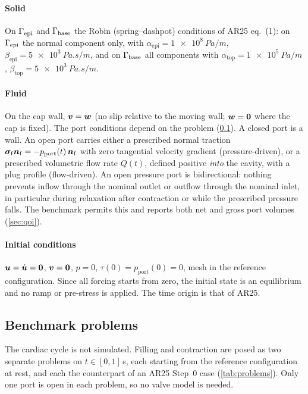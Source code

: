 \paragraph{Solid} On $\Gamma_{\mathrm{epi}}$ and $\Gamma_{\mathrm{base}}$ the Robin (spring--dashpot)
conditions of AR25 eq.~(1): on $\Gamma_{\mathrm{epi}}$ the normal component only, with
$\alpha_{\mathrm{epi}}=\SI{1e8}{Pa/m}$, $\beta_{\mathrm{epi}}=\SI{5e3}{Pa.s/m}$,
and on $\Gamma_{\mathrm{base}}$ all components with $\alpha_{\mathrm{top}}=\SI{1e5}{Pa/m}$,
$\beta_{\mathrm{top}}=\SI{5e3}{Pa.s/m}$.

\paragraph{Fluid} On the cap wall, $\bm{v}=\bm{w}$ (no slip relative to the moving
wall; $\bm{w}=\bm{0}$ where the cap is fixed). The port conditions depend on
the problem (\cref{sec:steps}). A closed port is a wall. An open port
carries either a prescribed normal traction
$\bm{\sigma}_{\mathrm f}\bm{n}_{\mathrm f} = -p_{\mathrm{port}}(t)\,\bm{n}_{\mathrm f}$
with zero tangential velocity gradient (pressure-driven), or a prescribed
volumetric flow rate $Q(t)$, defined positive \emph{into} the cavity, with a
plug profile (flow-driven). An open pressure port is bidirectional: nothing
prevents inflow through the nominal outlet or outflow through the nominal
inlet, in particular during relaxation after contraction or while the
prescribed pressure falls. The benchmark permits this and reports both net
and gross port volumes (\cref{sec:qoi}).

\paragraph{Initial conditions} $\bm{u}=\dot{\bm{u}}=\bm{0}$, $\bm{v}=\bm{0}$, $p=0$,
$\tau(0)=p_{\mathrm{port}}(0)=0$, mesh in the reference configuration. Since
all forcing starts from zero, the initial state is an equilibrium and no
ramp or pre-stress is applied. The time origin is that of AR25.

\subsection{Benchmark problems}\label{sec:steps}
The cardiac cycle is not simulated. Filling and contraction are posed as
two separate problems on $t\in[0,1]$\,s, each starting from the reference
configuration at rest, and each the counterpart of an AR25 Step~0 case
(\cref{tab:problems}). Only one port is open in each problem, so no valve
model is needed.

